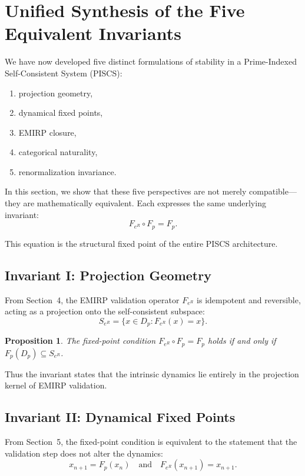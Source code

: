 \documentclass[11pt]{article}
\theoremstyle{definition}
\theoremstyle{plain}
\newtheorem{proposition}[definition]{Proposition}
\theoremstyle{remark}
\begin{document}
\section{Unified Synthesis of the Five Equivalent Invariants}

We have now developed five distinct formulations of stability in a
Prime-Indexed Self-Consistent System (PISCS):

\begin{enumerate}
    \item projection geometry,
    \item dynamical fixed points,
    \item EMIRP closure,
    \item categorical naturality,
    \item renormalization invariance.
\end{enumerate}

In this section, we show that these five perspectives are not merely
compatible—they are mathematically equivalent. Each expresses the same
underlying invariant:
\[
F_{e^R} \circ F_p = F_p.
\]

This equation is the structural fixed point of the entire PISCS
architecture.

\subsection{Invariant I: Projection Geometry}

From Section~4, the EMIRP validation operator $F_{e^R}$ is idempotent
and reversible, acting as a projection onto the self-consistent
subspace:
\[
S_{e^R} = \{ x \in D_p : F_{e^R}(x) = x \}.
\]

\begin{proposition}
The fixed-point condition $F_{e^R} \circ F_p = F_p$ holds if and only if
$F_p(D_p) \subseteq S_{e^R}$.
\end{proposition}

Thus the invariant states that the intrinsic dynamics lie entirely in
the projection kernel of EMIRP validation.

\subsection{Invariant II: Dynamical Fixed Points}

From Section~5, the fixed-point condition is equivalent to the statement
that the validation step does not alter the dynamics:
\[
x_{n+1} = F_p(x_n)
\quad \text{and} \quad
F_{e^R}(x_{n+1}) = x_{n+1}.
\]
\end{document}
